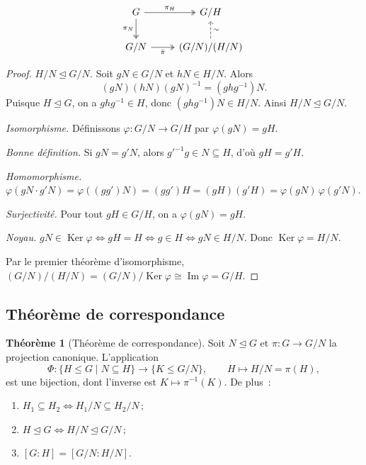 \documentclass[12pt,a4paper,openany]{book}
\theoremstyle{definition}
\newtheorem{theoreme}{Théorème}[chapter]
\DeclareMathOperator{\Ker}{Ker}
\renewcommand{\Im}{\operatorname{Im}}
\begin{document}
\[
\begin{tikzcd}
  G \arrow[r,"\pi_H",twoheadrightarrow] \arrow[d,"\pi_N"',twoheadrightarrow]
    & G/H \\
  G/N \arrow[r,"\bar{\pi}"',twoheadrightarrow]
    & (G/N)/(H/N) \arrow[u,"\sim"',dashed]
\end{tikzcd}
\]

\begin{proof}
  \emph{$H/N\trianglelefteq G/N$.} Soit $gN\in G/N$ et $hN\in H/N$.
  Alors
  \[
    (gN)(hN)(gN)^{-1} = (ghg^{-1})N.
  \]
  Puisque $H\trianglelefteq G$, on a $ghg^{-1}\in H$, donc
  $(ghg^{-1})N\in H/N$. Ainsi $H/N\trianglelefteq G/N$.

  \medskip

  \emph{Isomorphisme.} Définissons $\varphi\colon G/N\to G/H$
  par $\varphi(gN) = gH$.

  \emph{Bonne définition.} Si $gN = g'N$, alors $g'^{-1}g\in N\subseteq H$,
  d'où $gH = g'H$.

  \emph{Homomorphisme.}
  $\varphi(gN\cdot g'N) = \varphi((gg')N) = (gg')H = (gH)(g'H)
  = \varphi(gN)\,\varphi(g'N)$.

  \emph{Surjectivité.} Pour tout $gH\in G/H$, on a $\varphi(gN)=gH$.

  \emph{Noyau.}
  $gN\in\Ker\varphi \iff gH = H \iff g\in H \iff gN\in H/N$.
  Donc $\Ker\varphi = H/N$.

  Par le premier théorème d'isomorphisme,
  $(G/N)/(H/N) = (G/N)/\Ker\varphi \cong \Im\varphi = G/H$.
\end{proof}

\subsection{Théorème de correspondance}\label{subsec:correspondance}

\begin{theoreme}[Théorème de correspondance]\label{thm:correspondance}
  Soit $N\trianglelefteq G$ et $\pi\colon G\to G/N$ la projection
  canonique.
  L'application
  \[
    \Phi\colon \{H\leq G \mid N\subseteq H\} \to \{K\leq G/N\},
    \qquad H\mapsto H/N = \pi(H),
  \]
  est une bijection, dont l'inverse est $K\mapsto\pi^{-1}(K)$.
  De plus~:
  \begin{enumerate}[label=(\roman*)]
    \item $H_1\subseteq H_2 \iff H_1/N \subseteq H_2/N$\,;
    \item $H\trianglelefteq G \iff H/N\trianglelefteq G/N$\,;
    \item $[G:H] = [G/N : H/N]$.
  \end{enumerate}
\end{theoreme}
\end{document}
